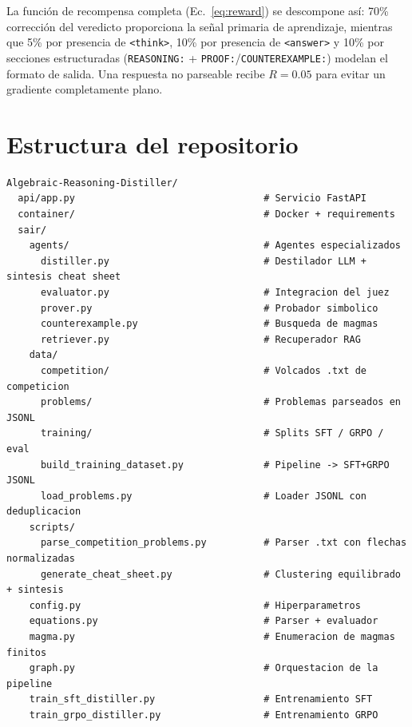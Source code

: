 \documentclass{article}
\begin{document}
La funci\'on de recompensa completa (Ec.~\ref{eq:reward}) se descompone as\'i: 70\% correcci\'on del veredicto proporciona la se\~nal primaria de aprendizaje, mientras que 5\% por presencia de \texttt{<think>}, 10\% por presencia de \texttt{<answer>} y 10\% por secciones estructuradas (\texttt{REASONING:} + \texttt{PROOF:}/\texttt{COUNTEREXAMPLE:}) modelan el formato de salida. Una respuesta no parseable recibe $R{=}0.05$ para evitar un gradiente completamente plano.

\section{Estructura del repositorio}
\label{app:repo}

\begin{verbatim}
Algebraic-Reasoning-Distiller/
  api/app.py                                 # Servicio FastAPI
  container/                                 # Docker + requirements
  sair/
    agents/                                  # Agentes especializados
      distiller.py                           # Destilador LLM + sintesis cheat sheet
      evaluator.py                           # Integracion del juez
      prover.py                              # Probador simbolico
      counterexample.py                      # Busqueda de magmas
      retriever.py                           # Recuperador RAG
    data/
      competition/                           # Volcados .txt de competicion
      problems/                              # Problemas parseados en JSONL
      training/                              # Splits SFT / GRPO / eval
      build_training_dataset.py              # Pipeline -> SFT+GRPO JSONL
      load_problems.py                       # Loader JSONL con deduplicacion
    scripts/
      parse_competition_problems.py          # Parser .txt con flechas normalizadas
      generate_cheat_sheet.py                # Clustering equilibrado + sintesis
    config.py                                # Hiperparametros
    equations.py                             # Parser + evaluador
    magma.py                                 # Enumeracion de magmas finitos
    graph.py                                 # Orquestacion de la pipeline
    train_sft_distiller.py                   # Entrenamiento SFT
    train_grpo_distiller.py                  # Entrenamiento GRPO
\end{verbatim}

\end{document}
